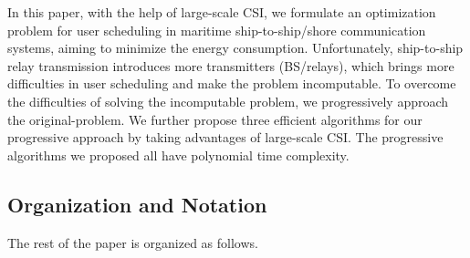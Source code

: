 \documentclass[conference]{IEEEtran}
\begin{document}
 
 
 
 
 
 
 In this paper, with the help of large-scale CSI, we formulate an optimization problem for user scheduling in maritime ship-to-ship/shore communication systems, aiming to minimize the energy consumption. %
 Unfortunately, ship-to-ship relay transmission introduces more transmitters (BS/relays), which brings more difficulties in user scheduling and make the problem incomputable. %
 To overcome the difficulties of solving the incomputable problem, we progressively approach the original-problem. We further propose three efficient algorithms for our progressive approach by taking advantages of large-scale CSI. The progressive algorithms we proposed all have polynomial time complexity.
 
 \subsection{Organization and Notation}
 The rest of the paper is organized as follows.
 
\end{document}
